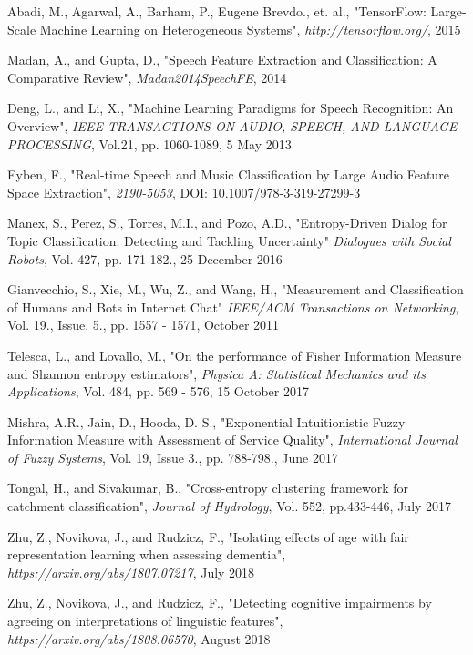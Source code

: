 \begin{thebibliography}{100}
    
     Abadi, M., Agarwal, A., Barham, P., Eugene Brevdo., et. al.,
    			"TensorFlow: Large-Scale Machine Learning on Heterogeneous Systems",
			\emph{http://tensorflow.org/}, 2015

    
     Madan, A., and Gupta, D.,
    			"Speech Feature Extraction and Classification: A Comparative Review",
			\emph{Madan2014SpeechFE}, 2014

    
    Deng, L., and Li, X., 
    			"Machine Learning Paradigms for Speech Recognition: An Overview",
			\emph{IEEE TRANSACTIONS ON AUDIO, SPEECH, AND LANGUAGE PROCESSING},
			Vol.21, pp. 1060-1089, 5 May 2013

    
     Eyben, F.,
    			"Real-time Speech and Music Classification by Large Audio Feature Space Extraction",
			\emph{2190-5053}, DOI: 10.1007/978-3-319-27299-3

    
     Manex, S., Perez, S., Torres, M.I., and Pozo, A.D.,
    			"Entropy-Driven Dialog for Topic Classification: Detecting and Tackling Uncertainty"
			\emph{Dialogues with Social Robots},
			Vol. 427, pp. 171-182., 25 December 2016
    
     Gianvecchio, S., Xie, M., Wu, Z., and Wang, H.,
    			"Measurement and Classification of Humans and Bots in Internet Chat"
			\emph{IEEE/ACM Transactions on Networking},
			Vol. 19., Issue. 5., pp. 1557 - 1571, October 2011
    
     Telesca, L., and Lovallo, M., 
    			"On the performance of Fisher Information Measure and Shannon entropy estimators",
			\emph{Physica A: Statistical Mechanics and its Applications},
			Vol. 484, pp. 569 - 576, 15 October 2017

    
     Mishra, A.R., Jain, D., Hooda, D. S.,
    			"Exponential Intuitionistic Fuzzy Information Measure with Assessment of Service Quality",
    			\emph{International Journal of Fuzzy Systems},
			Vol. 19, Issue 3., pp. 788-798., June 2017

    
     Tongal, H., and Sivakumar, B.,
    			"Cross-entropy clustering framework for catchment classification",
			\emph{Journal of Hydrology}, Vol. 552, pp.433-446, July 2017

    Zhu, Z., Novikova, J., and Rudzicz, F.,
    			"Isolating effects of age with fair representation learning when assessing dementia",
    			\emph{https://arxiv.org/abs/1807.07217},
			July 2018

    
    Zhu, Z., Novikova, J., and Rudzicz, F.,
    			"Detecting cognitive impairments by agreeing on interpretations of linguistic features",
			\emph{https://arxiv.org/abs/1808.06570}, August 2018
    

\end{thebibliography}
